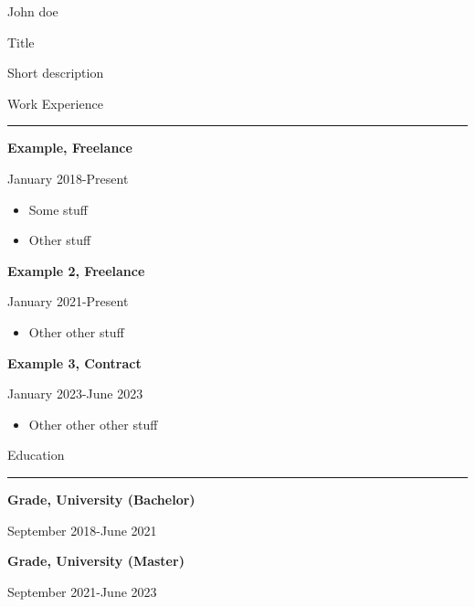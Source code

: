 \documentclass{letter}
\begin{document}
\begin{minipage}[t]{0.60\textwidth}
\setlength{\baselineskip}{1.5\baselineskip}
\vspace{0.8cm}
{\huge John doe}

{\large Title}

\vspace{0.5cm}
 
Short description

\vspace{0.5cm}

{\large Work Experience}
\rule{\linewidth}{0.4pt}

{\large \textbf{Example, Freelance}}

{\small January 2018-Present}

\begin{itemize}
    \item Some stuff
    \item Other stuff
\end{itemize}

{\large \textbf{Example 2, Freelance}}

{\small January 2021-Present}

\begin{itemize}
    \item Other other stuff
\end{itemize}


{\large \textbf{Example 3, Contract}}

{\small January 2023-June 2023}

\begin{itemize}
    \item Other other other stuff
\end{itemize}

{\large Education}
\rule{\linewidth}{0.4pt}

{\large \textbf{Grade, University (Bachelor)}}

{\small September 2018-June 2021}

{\large \textbf{Grade, University (Master)}}

{\small September 2021-June 2023}


\end{minipage}
\end{document}

